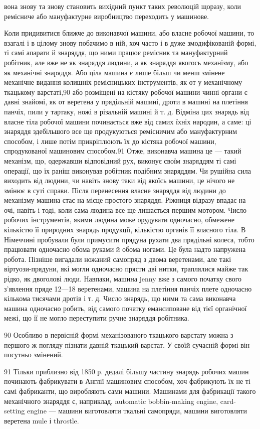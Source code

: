 вона знову та знову становить вихідний пункт таких революцій
щоразу, коли ремісниче або мануфактурне виробництво переходить
у машинове.

Коли придивитися ближче до виконавчої машини, або власне
робочої машини, то взагалі і в цілому знову побачимо в ній, хоч
часто і в дуже змодифікованій формі, ті самі апарати й знаряддя,
що ними працює ремісник та мануфактурний робітник, але
вже не як знаряддя людини, а як знаряддя якогось механізму,
або як механічні знаряддя. Або ціла машина є лише більш
чи менш змінене механічне видання колишніх ремісницьких
інструментів, як от у механічному ткацькому варстаті,90 або
розміщені на кістяку робочої машини чинні органи є давні
знайомі, як от веретена у прядільній машині, дроти в машині
на плетіння панчіх, пили у тартаку, ножі в різальній машині
й т. д. Відміна цих знарядь від власне тіла робочої машини
починається вже від самих їхніх народин, а саме: ці знаряддя
здебільшого все ще продукуються ремісничим або мануфактурним
способом, і лише потім прикріплюють їх до кістяка
робочої машини, спродукованої машиновим способом.91 Отже,
виконавча машина це — такий механізм, що, одержавши відповідний
рух, виконує своїм знаряддям ті самі операції, що їх раніш
виконував робітник подібним знаряддям. Чи рушійна сила виходить
від людини, чи навіть знову таки від якоїсь машини, це
нічого не змінює в суті справи. Після перенесення власне знаряддя
від людини до механізму машина стає на місце простого знаряддя.
Ріжниця відразу впадає на очі, навіть і тоді, коли сама людина
все ще лишається першим мотором. Число робочих інструментів,
якими людина може орудувати одночасно, обмежене кількістю
її природних знарядь продукції, кількістю органів її власного
тіла. В Німеччині пробували були примусити прядуна рухати
два прядільні колеса, тобто працювати одночасно обома руками
й обома ногами. Це була надто напружена робота. Пізніше вигадали
ножаний самопряд з двома веретенами, але такі віртуози-прядуни,
які могли одночасно прясти дві нитки, траплялися майже
так рідко, як двоголові люди. Навпаки, машина jenny вже з
самого початку свого з’явлення пряде 12—18 веретенами, машина
на плетіння панчіх плете одночасно кількома тисячами дротів і
т. д. Число знарядь, що ними та сама виконавча машина одночасно
робить, від самого початку емансиповане від тієї органічної
межі, що її не могло переступити ручне знаряддя робітника.

90 Особливо в первісній формі механізованого ткацького варстату
можна з першого ж погляду пізнати давній ткацький варстат. У своїй
сучасній формі він посутньо змінений.

91 Тільки приблизно від 1850 р. дедалі більшу частину знарядь робочих
машин починають фабрикувати в Англії машиновим способом, хоч
фабрикують їх не ті самі фабриканти, що виробляють сами машини.
Машинами для фабрикації такого механічного знаряддя є, наприклад,
automatic bobbin-making engine, card-setting engine — машини виготовляти
ткальні самопряди, машини виготовляти веретена mule і throstle.
